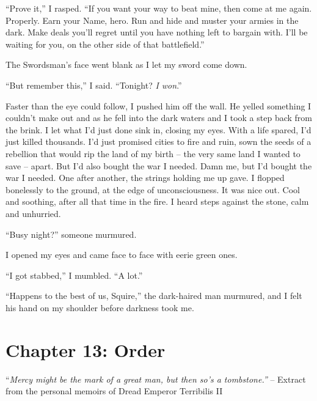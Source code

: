 \documentclass[12pt, openany]{book}
\begin{document}
“Prove it,” I rasped. “If you want your way to beat mine, then come at me again. Properly. Earn your Name, hero. Run and hide and muster your armies in the dark. Make deals you’ll regret until you have nothing left to bargain with. I’ll be waiting for you, on the other side of that battlefield.”

The Swordsman’s face went blank as I let my sword come down.

“But remember this,” I said. “Tonight? \textit{I won}.”

Faster than the eye could follow, I pushed him off the wall. He yelled something I couldn’t make out and as he fell into the dark waters and I took a step back from the brink. I let what I’d just done sink in, closing my eyes. With a life spared, I’d just killed thousands. I’d just promised cities to fire and ruin, sown the seeds of a rebellion that would rip the land of my birth – the very same land I wanted to save – apart. But I’d also bought the war I needed. Damn me, but I’d bought the war I needed. One after another, the strings holding me up gave. I flopped bonelessly to the ground, at the edge of unconsciousness. It was nice out. Cool and soothing, after all that time in the fire. I heard steps against the stone, calm and unhurried. 

“Busy night?” someone murmured.

I opened my eyes and came face to face with eerie green ones.

“I got stabbed,” I mumbled. “A lot.”

“Happens to the best of us, Squire,” the dark-haired man murmured, and I felt his hand on my shoulder before darkness took me.
\clearpage
\chapter{Chapter 13: Order}

“\textit{Mercy might be the mark of a great man, but then so’s a tombstone.”}
– Extract from the personal memoirs of Dread Emperor Terribilis II
\end{document}
